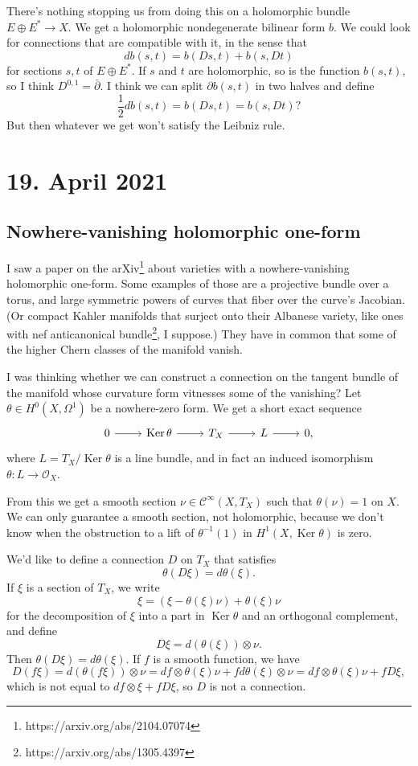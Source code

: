 \documentclass[11pt]{amsart}
\theoremstyle{definition}
\newcommand{\cc}[1]{\mathcal{#1}}
\DeclareMathOperator{\Ker}{Ker}
\begin{document}
There's nothing stopping us from doing this on a holomorphic bundle $E \oplus E^* \to X$. We get a holomorphic nondegenerate bilinear form $b$. We could look for connections that are compatible with it, in the sense that
\[
d b(s, t) = b(Ds, t) + b(s, Dt)
\]
for sections $s, t$ of $E \oplus E^*$. If $s$ and $t$ are holomorphic, so is the function $b(s, t)$, so I think $D^{0,1} = \bar\partial$. I think we can split $\partial b(s, t)$ in two halves and define
\[
\frac 12 d b(s, t) = b(Ds, t) = b(s, Dt)?
\]
But then whatever we get won't satisfy the Leibniz rule.


\section*{19. April 2021}
\subsection*{Nowhere-vanishing holomorphic one-form}


I saw a paper on the arXiv\footnote{https://arxiv.org/abs/2104.07074} about varieties with a nowhere-vanishing holomorphic one-form. Some examples of those are a projective bundle over a torus, and large symmetric powers of curves that fiber over the curve's Jacobian. (Or compact Kahler manifolds that surject onto their Albanese variety, like ones with nef anticanonical bundle\footnote{https://arxiv.org/abs/1305.4397}, I suppose.) They have in common that some of the higher Chern classes of the manifold vanish.

I was thinking whether we can construct a connection on the tangent bundle of the manifold whose curvature form vitnesses some of the vanishing? Let $\theta \in H^0(X, \Omega^1)$ be a nowhere-zero form. We get a short exact sequence
\[
\begin{tikzcd}
0 \ar[r] &
\Ker \theta \ar[r] &
T_X \ar[r] &
L \ar[r] &
0,
\end{tikzcd}
\]
where $L = T_X / \Ker \theta$ is a line bundle, and in fact an induced isomorphism $\theta : L \to \cc O_X$.

From this we get a smooth section $\nu \in \cc C^\infty(X, T_X)$ such that $\theta(\nu) = 1$ on $X$. We can only guarantee a smooth section, not holomorphic, because we don't know when the obstruction to a lift of $\theta^{-1}(1)$ in $H^1(X, \Ker \theta)$ is zero.


We'd like to define a connection $D$ on $T_X$ that satisfies
\[
\theta(D\xi) = d \theta(\xi).
\]
If $\xi$ is a section of $T_X$, we write
\[
\xi = (\xi - \theta(\xi)\nu) + \theta(\xi) \nu
\]
for the decomposition of $\xi$ into a part in $\Ker \theta$ and an orthogonal complement,
and define
\[
D\xi = d(\theta(\xi)) \otimes \nu.
\]
Then $\theta(D\xi) = d \theta(\xi)$. If $f$ is a smooth function, we have
\[
D(f\xi)
= d(\theta(f\xi)) \otimes \nu
= df \otimes \theta(\xi) \nu + f d\theta(\xi) \otimes \nu
= df \otimes \theta(\xi) \nu + f D\xi,
\]
which is not equal to $df \otimes \xi + f D\xi$,
so $D$ is not a connection.
\end{document}
